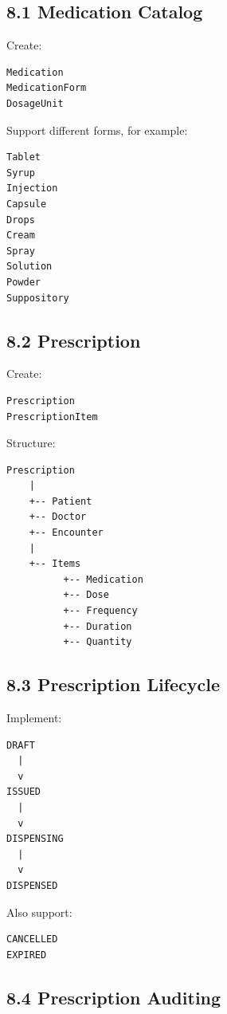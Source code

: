 \documentclass[11pt,a4paper]{article}
\begin{document}
\subsection{8.1 Medication Catalog}

Create:

\begin{lstlisting}
Medication
MedicationForm
DosageUnit
\end{lstlisting}

Support different forms, for example:

\begin{lstlisting}
Tablet
Syrup
Injection
Capsule
Drops
Cream
Spray
Solution
Powder
Suppository
\end{lstlisting}

\subsection{8.2 Prescription}

Create:

\begin{lstlisting}
Prescription
PrescriptionItem
\end{lstlisting}

Structure:

\begin{lstlisting}
Prescription
    |
    +-- Patient
    +-- Doctor
    +-- Encounter
    |
    +-- Items
          +-- Medication
          +-- Dose
          +-- Frequency
          +-- Duration
          +-- Quantity
\end{lstlisting}

\subsection{8.3 Prescription Lifecycle}

Implement:

\begin{lstlisting}
DRAFT
  |
  v
ISSUED
  |
  v
DISPENSING
  |
  v
DISPENSED
\end{lstlisting}

Also support:

\begin{lstlisting}
CANCELLED
EXPIRED
\end{lstlisting}

\subsection{8.4 Prescription Auditing}
\end{document}
